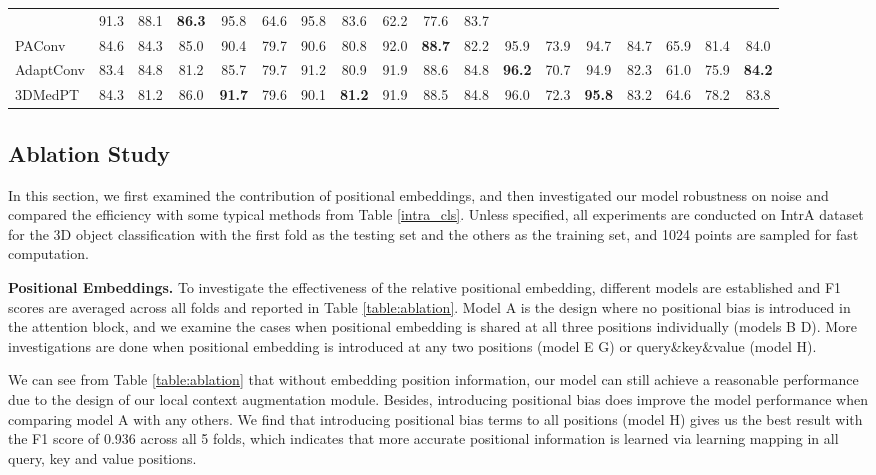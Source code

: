 \documentclass[10pt,twocolumn,letterpaper]{article}
\begin{document}
\begin{table*}
\begin{tabular}{l|@{ }c@{ }|@{ }c@{ }@{ }c@{ }@{ }c@{ }@{ }c@{ }@{ }c@{ }@{ }c@{ }@{ }c@{ }@{ }c@{ }@{ }c@{ }@{ }c@{ }@{ }c@{ }@{ }c@{ }@{ }c@{ }@{ }c@{ }@{ }c@{ }@{ }c@{ }}
                              & 91.3 & 88.1 & \textbf{86.3} & 95.8 & 64.6 & 95.8 & 83.6 & 62.2 & 77.6 & 83.7 \\
PAConv \cite{paconv}          & 84.6 & 84.3 & 85.0 & 90.4 & 79.7 & 90.6 & 80.8 & 92.0 & \textbf{88.7} & 82.2 
                              & 95.9 & 73.9 & 94.7 & 84.7 & 65.9 & 81.4 & 84.0 \\
AdaptConv \cite{adapconv}     & 83.4 & 84.8 & 81.2 & 85.7 & 79.7 & 91.2 & 80.9 & 91.9 & 88.6 & 84.8 
                              & \textbf{96.2} & 70.7 & 94.9 & 82.3 & 61.0 & 75.9 & \textbf{84.2} \\ 
\hline
3DMedPT                       & 84.3 & 81.2 & 86.0 & \textbf{91.7} & 79.6 & 90.1 & \textbf{81.2} & 91.9 & 88.5 
                              & 84.8 & 96.0 & 72.3 & \textbf{95.8} & 83.2 & 64.6 & 78.2 & 83.8 \\
\hline
\end{tabular}
\end{table*}



\subsection{Ablation Study} \label{ablation}
In this section, we first examined the contribution of positional embeddings, and then investigated our model robustness on noise and compared the efficiency with some typical methods from Table \ref{intra_cls}.
Unless specified, all experiments are conducted on IntrA dataset for the 3D object classification with the first fold as the testing set and the others as the training set, and 1024 points are sampled for fast computation.


\noindent \textbf{Positional Embeddings.}
To investigate the effectiveness of the relative positional embedding, different models are established and F1 scores are averaged across all folds and reported in Table \ref{table:ablation}.
Model A is the design where no positional bias is introduced in the attention block, and we examine the cases when positional embedding is shared at all three positions individually (models B  D).
More investigations are done when positional embedding is introduced at any two positions (model E  G) or query\&key\&value (model H).



We can see from Table \ref{table:ablation} that without embedding position information, our model can still achieve a reasonable performance due to the design of our local context augmentation module.
Besides, introducing positional bias does improve the model performance when comparing model A with any others.
We find that introducing positional bias terms to all positions (model H) gives us the best result with the F1 score of 0.936 across all 5 folds, which indicates that more accurate positional information is learned via learning mapping in all query, key and value positions.
\end{document}
